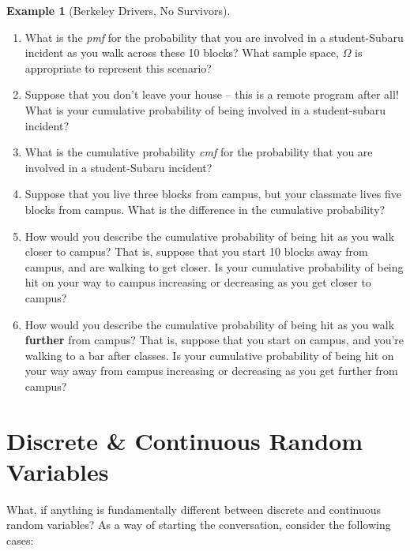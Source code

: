 \documentclass[
]{book}
\providecommand{\tightlist}{%
  \setlength{\itemsep}{0pt}\setlength{\parskip}{0pt}}
\theoremstyle{definition}
\theoremstyle{definition}
\newtheorem{example}{Example}[chapter]
\theoremstyle{definition}
\theoremstyle{definition}
\theoremstyle{remark}
\begin{document}
\begin{example}[Berkeley Drivers, No Survivors]
\begin{enumerate}
\def\labelenumi{\arabic{enumi}.}
\tightlist
\item
  What is the \emph{pmf} for the probability that you are involved in a student-Subaru incident as you walk across these 10 blocks? What sample space, \(\Omega\) is appropriate to represent this scenario?
\item
  Suppose that you don't leave your house -- this is a remote program after all! What is your cumulative probability of being involved in a student-subaru incident?\\
\item
  What is the cumulative probability \emph{cmf} for the probability that you are involved in a student-Subaru incident?
\item
  Suppose that you live three blocks from campus, but your classmate lives five blocks from campus. What is the difference in the cumulative probability?
\item
  How would you describe the cumulative probability of being hit as you walk closer to campus? That is, suppose that you start 10 blocks away from campus, and are walking to get closer. Is your cumulative probability of being hit on your way to campus increasing or decreasing as you get closer to campus?
\item
  How would you describe the cumulative probability of being hit as you walk \textbf{further} from campus? That is, suppose that you start on campus, and you're walking to a bar after classes. Is your cumulative probability of being hit on your way away from campus increasing or decreasing as you get further from campus?
\end{enumerate}

\end{example}

\section{Discrete \& Continuous Random Variables}\label{discrete-continuous-random-variables}

What, if anything is fundamentally different between discrete and continuous random variables? As a way of starting the conversation, consider the following cases:
\end{document}
